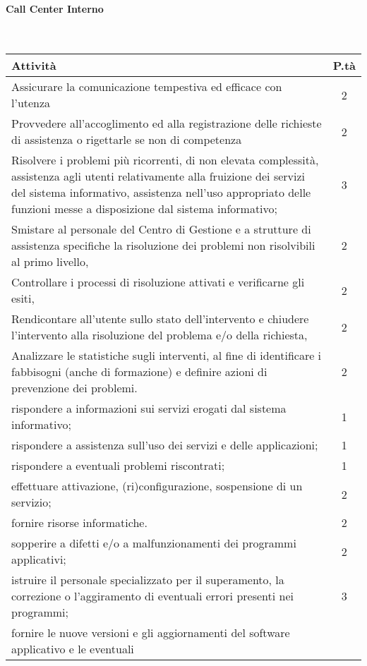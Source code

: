 \paragraph{Call Center Interno}
\textcolor{white}{.} \\
\renewcommand\arraystretch{1,3}
\begin{longtable}{p{13cm} c }
\toprule
\textbf{Attività} & \textbf{P.tà} \\
\toprule
Assicurare la comunicazione tempestiva ed efficace con l’utenza & 2 \\
Provvedere all’accoglimento ed alla registrazione delle richieste di assistenza o rigettarle se non di competenza  &2 \\
Risolvere  i  problemi  più  ricorrenti,  di  non  elevata  complessità,  assistenza  agli  utenti  relativamente  alla  fruizione  dei  servizi  del   sistema  informativo,   assistenza  nell'uso appropriato delle funzioni messe a disposizione dal sistema informativo;  & 3 \\
Smistare  al  personale  del  Centro  di  Gestione  e  a  strutture  di  assistenza  specifiche  la risoluzione dei problemi non risolvibili al primo livello,  &2 \\
Controllare i processi di risoluzione attivati e verificarne gli esiti,  & 2\\
Rendicontare all’utente sullo stato dell’intervento e chiudere l’intervento alla risoluzione del problema e/o della richiesta,  & 2  \\
Analizzare  le  statistiche  sugli  interventi,  al  fine  di  identificare  i  fabbisogni  (anche  di formazione) e definire azioni di prevenzione dei problemi.  & 2 \\
rispondere a informazioni sui servizi erogati dal sistema informativo;  & 1 \\
rispondere a assistenza sull’uso dei servizi e delle applicazioni;  & 1 \\
rispondere a eventuali problemi riscontrati;  & 1 \\
effettuare attivazione, (ri)configurazione, sospensione di un servizio;  & 2 \\
fornire risorse informatiche.  &2 \\
sopperire a difetti e/o a malfunzionamenti dei programmi applicativi; & 2 \\
istruire  il  personale  specializzato  per  il  superamento,  la  correzione  o  l'aggiramento  di eventuali errori presenti nei programmi; & 3 \\
fornire  le  nuove  versioni  e  gli  aggiornamenti  del  software  applicativo  e  le  eventuali 

\end{longtable}
